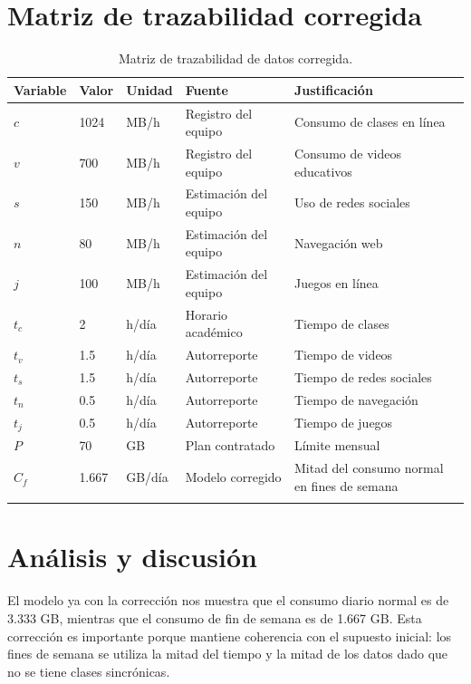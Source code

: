\documentclass[12pt,a4paper]{article}
\begin{document}
\begin{center}
		\section{Matriz de trazabilidad corregida}
		
		\begin{longtable}{|p{3cm}|p{2cm}|p{2cm}|p{4cm}|p{4cm}|}
			\hline
			\rowcolor{azulclaro}
			\textbf{Variable} & \textbf{Valor} & \textbf{Unidad} & \textbf{Fuente} & \textbf{Justificación} \\ \hline
			$c$ & 1024 & MB/h & Registro del equipo & Consumo de clases en línea \\ \hline
			$v$ & 700 & MB/h & Registro del equipo & Consumo de videos educativos \\ \hline
			$s$ & 150 & MB/h & Estimación del equipo & Uso de redes sociales \\ \hline
			$n$ & 80 & MB/h & Estimación del equipo & Navegación web \\ \hline
			$j$ & 100 & MB/h & Estimación del equipo & Juegos en línea \\ \hline
			$t_c$ & 2 & h/día & Horario académico & Tiempo de clases \\ \hline
			$t_v$ & 1.5 & h/día & Autorreporte & Tiempo de videos \\ \hline
			$t_s$ & 1.5 & h/día & Autorreporte & Tiempo de redes sociales \\ \hline
			$t_n$ & 0.5 & h/día & Autorreporte & Tiempo de navegación \\ \hline
			$t_j$ & 0.5 & h/día & Autorreporte & Tiempo de juegos \\ \hline
			$P$ & 70 & GB & Plan contratado & Límite mensual \\ \hline
			$C_f$ & 1.667 & GB/día & Modelo corregido & Mitad del consumo normal en fines de semana \\ \hline
			\caption{Matriz de trazabilidad de datos corregida.}
		\end{longtable}
		
		\section{Análisis y discusión}
		
		El modelo ya con la corrección nos muestra que el consumo diario normal es de 3.333 GB, mientras que el consumo de fin de semana es de 1.667 GB. Esta corrección es importante porque mantiene coherencia con el supuesto inicial: los fines de semana se utiliza la mitad del tiempo y la mitad de los datos dado que no se tiene clases sincrónicas.
		

\end{center}
\end{document}

